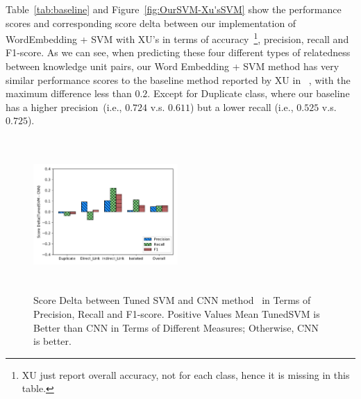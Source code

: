 \documentclass[sigconf]{acmart}
\theoremstyle{break}
\newcommand{\fig}[1]{Figure~\ref{fig:#1}}
\newcommand{\tab}[1]{Table~\ref{tab:#1}}
\begin{document}
 \tab{baseline}  and \fig{OurSVM-Xu'sSVM} show the performance scores and corresponding score delta between our implementation of WordEmbedding + SVM  with
 XU's in terms of accuracy~\footnote{XU just report overall accuracy, not for each class, hence it is missing in this table.}, precision, recall and F1-score. As we can see, 
 when predicting these four different types of relatedness between knowledge unit pairs,
 our Word Embedding + SVM method has  very  similar performance scores to the baseline method
 reported by XU in ~\cite{xu2016predicting}, with the maximum difference less than $0.2$.  
 Except for { Duplicate} class, where our baseline 
has a higher precision~(i.e., $0.724$ v.s. $0.611$) but a lower  recall (i.e., $0.525$ v.s.$0.725$). 



 
 \begin{figure}[!htp]
    \centering
    \includegraphics[width=0.49\textwidth,height=2.3in]{pic/TunedSVM-CNN.pdf} %
    \caption{Score Delta between Tuned SVM and CNN method~\cite{xu2016predicting} in Terms of Precision, Recall and F1-score. Positive Values Mean
            TunedSVM is Better than CNN in Terms of Different Measures; Otherwise, CNN is better.}
    \label{fig:TunedSVM-CNN}
\end{figure}
\end{document}
